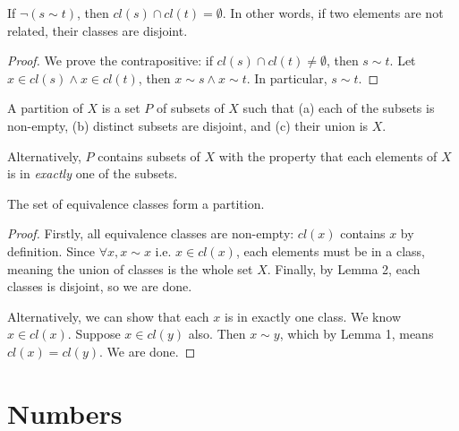 \documentclass[11pt]{article}
\begin{document}
\begin{lemma}
  If \(\lnot (s \sim t)\), then \(cl(s) \cap cl(t) = \emptyset\). In other words, if two elements are not related, their classes are disjoint.
\end{lemma}
\begin{proof}
  We prove the contrapositive: if \(cl(s) \cap cl(t) \neq \emptyset\), then \(s \sim t\). Let \(x \in cl(s) \land x \in cl(t)\), then \(x \sim s \land x \sim t\). In particular, \(s \sim t\). 
\end{proof}

\begin{definition}[Partition]
  A partition of \(X\) is a set \(P\) of subsets of \(X\) such that (a) each of the subsets is non-empty, (b) distinct subsets are disjoint, and (c) their union is \(X\). 
  
  Alternatively, \(P\) contains subsets of \(X\) with the property that each elements of \(X\) is in \textit{exactly} one of the subsets.
\end{definition}

\begin{theorem}
  The set of equivalence classes form a partition.
\end{theorem}
\begin{proof}
  Firstly, all equivalence classes are non-empty: \(cl(x)\) contains \(x\) by definition. Since \(\forall x, x \sim x\) i.e. \(x \in cl(x)\), each elements must be in a class, meaning the union of classes is the whole set \(X\). Finally, by Lemma 2, each classes is disjoint, so we are done.

  Alternatively, we can show that each \(x\) is in exactly one class. We know \(x \in cl(x)\). Suppose \(x \in cl(y)\) also. Then \(x \sim y\), which by Lemma 1, means \(cl(x) = cl(y)\). We are done.
\end{proof}

\section{Numbers}
\end{document}
